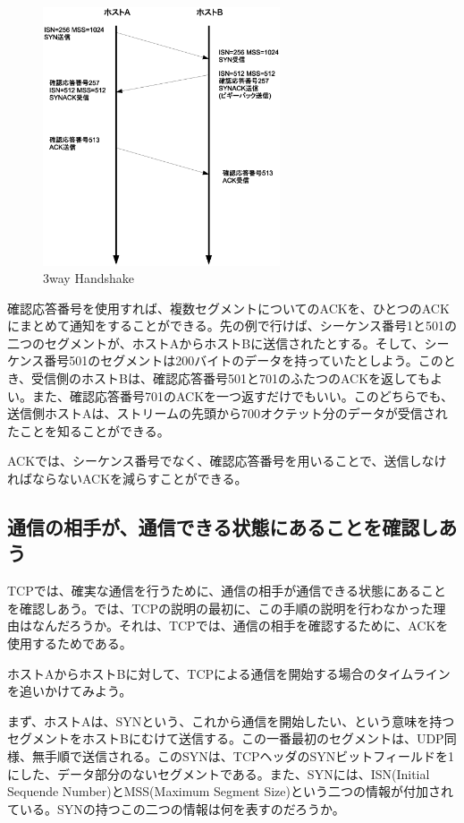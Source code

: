 \begin{figure}
	\includegraphics[width=7cm, clip]{draw/tcp04n.eps}
	\caption{3way Handshake}
	\label{fig:tcp04}
\end{figure}

確認応答番号を使用すれば、複数セグメントについてのACKを、ひとつのACKにまとめて通知をすることができる。先の例で行けば、シーケンス番号1と501の二つのセグメントが、ホストAからホストBに送信されたとする。そして、シーケンス番号501のセグメントは200バイトのデータを持っていたとしよう。このとき、受信側のホストBは、確認応答番号501と701のふたつのACKを返してもよい。また、確認応答番号701のACKを一つ返すだけでもいい。このどちらでも、送信側ホストAは、ストリームの先頭から700オクテット分のデータが受信されたことを知ることができる。

ACKでは、シーケンス番号でなく、確認応答番号を用いることで、送信しなければならないACKを減らすことができる。



\subsection{通信の相手が、通信できる状態にあることを確認しあう}



TCPでは、確実な通信を行うために、通信の相手が通信できる状態にあることを確認しあう。では、TCPの説明の最初に、この手順の説明を行わなかった理由はなんだろうか。それは、TCPでは、通信の相手を確認するために、ACKを使用するためである。

ホストAからホストBに対して、TCPによる通信を開始する場合のタイムラインを追いかけてみよう。

まず、ホストAは、SYNという、これから通信を開始したい、という意味を持つセグメントをホストBにむけて送信する。この一番最初のセグメントは、UDP同様、無手順で送信される。このSYNは、TCPヘッダのSYNビットフィールドを1にした、データ部分のないセグメントである。また、SYNには、ISN(Initial Sequende Number)とMSS(Maximum Segment Size)という二つの情報が付加されている。SYNの持つこの二つの情報は何を表すのだろうか。



